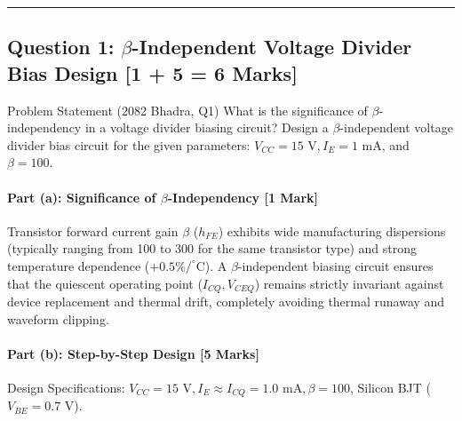 \documentclass[11pt,a4paper,oneside]{book}
\begin{document}
\vspace{0.6cm}
\hrule
\vspace{0.6cm}

\subsection{Question 1: $\beta$-Independent Voltage Divider Bias Design [1 + 5 = 6 Marks]}
\begin{questionbox}{Problem Statement (2082 Bhadra, Q1)}
What is the significance of $\beta$-independency in a voltage divider biasing circuit? Design a $\beta$-independent voltage divider bias circuit for the given parameters: $V_{CC} = 15\text{ V}, I_E = 1\text{ mA}$, and $\beta = 100$.
\end{questionbox}

\paragraph{Part (a): Significance of $\beta$-Independency [1 Mark]}
Transistor forward current gain $\beta$ ($h_{FE}$) exhibits wide manufacturing dispersions (typically ranging from 100 to 300 for the same transistor type) and strong temperature dependence ($+0.5\%/^\circ\text{C}$). A $\beta$-independent biasing circuit ensures that the quiescent operating point ($I_{CQ}, V_{CEQ}$) remains strictly invariant against device replacement and thermal drift, completely avoiding thermal runaway and waveform clipping.

\paragraph{Part (b): Step-by-Step Design [5 Marks]}
Design Specifications: $V_{CC} = 15\text{ V}, I_{E} \approx I_{CQ} = 1.0\text{ mA}, \beta = 100$, Silicon BJT ($V_{BE} = 0.7\text{ V}$).
\end{document}
